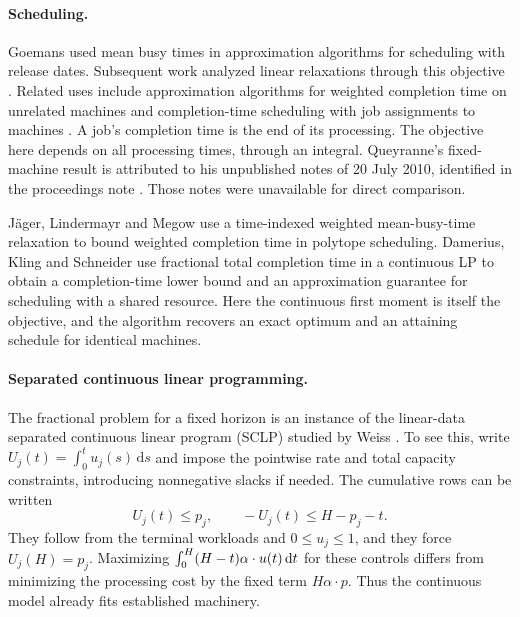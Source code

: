 \paragraph{Scheduling.}
Goemans \cite{goemans1997} used mean busy times in approximation algorithms for scheduling with release dates. Subsequent work analyzed linear relaxations through this objective \cite{goemans2002}. Related uses include approximation algorithms for weighted completion time on unrelated machines \cite{sitters2017} and completion-time scheduling with job assignments to machines \cite{sethuraman1999}. A job's completion time is the end of its processing. The objective here depends on all processing times, through an integral. Queyranne's fixed-machine result is attributed to his unpublished notes of 20 July 2010, identified in the proceedings note \cite[discussion~3 and ref.~4]{queyranne2010}. Those notes were unavailable for direct comparison.

J\"ager, Lindermayr and Megow \cite{jaeger2026} use a time-indexed weighted mean-busy-time relaxation to bound weighted completion time in polytope scheduling. Damerius, Kling and Schneider \cite{damerius2024} use fractional total completion time in a continuous LP to obtain a completion-time lower bound and an approximation guarantee for scheduling with a shared resource. Here the continuous first moment is itself the objective, and the algorithm recovers an exact optimum and an attaining schedule for identical machines.

\paragraph{Separated continuous linear programming.}
The fractional problem for a fixed horizon is an instance of the linear-data separated continuous linear program (SCLP) studied by Weiss \cite{weiss2008}. To see this, write $U_j(t)=\int_0^t u_j(s)\,\mathrm{d}s$ and impose the pointwise rate and total capacity constraints, introducing nonnegative slacks if needed. The cumulative rows can be written
\[
 U_j(t)\leq p_j,\qquad -U_j(t)\leq H-p_j-t .
\]
They follow from the terminal workloads and $0\leq u_j\leq1$, and they force $U_j(H)=p_j$. Maximizing $\int_0^H(H-t)\alpha\cdot u(t)\,\mathrm{d}t$ for these controls differs from minimizing the processing cost by the fixed term $H\alpha\cdot p$. Thus the continuous model already fits established machinery.

